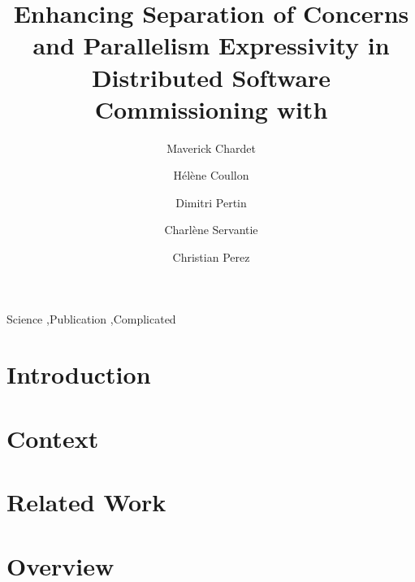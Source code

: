\documentclass[5p]{elsarticle}
\begin{document}
\begin{frontmatter}

\title{Enhancing Separation of Concerns and Parallelism Expressivity
  in Distributed Software Commissioning with \mad}

\author[label1]{Maverick Chardet}
\author[label1]{Hélène Coullon}
\author[label1]{Dimitri Pertin}
\author[label1]{Charlène Servantie}
\address[label1]{IMT Atlantique, Inria, LS2N, UBL, F-44307 Nantes, France}

\author[label2]{Christian Perez}
\address[label2]{Univ. Lyon, Inria, CNRS, ENS de Lyon, UCBL 1, LIP, Lyon, France}


\begin{abstract}
\end{abstract}

\begin{keyword}
Science \sep Publication \sep Complicated
\end{keyword}

\end{frontmatter}


\section{Introduction}
\label{sec:introduction}


\section{Context}
\label{sec:context}


\section{Related Work}
\label{sec:related_work}


\section{Overview}
\label{sec:mad_model}

\end{document}
